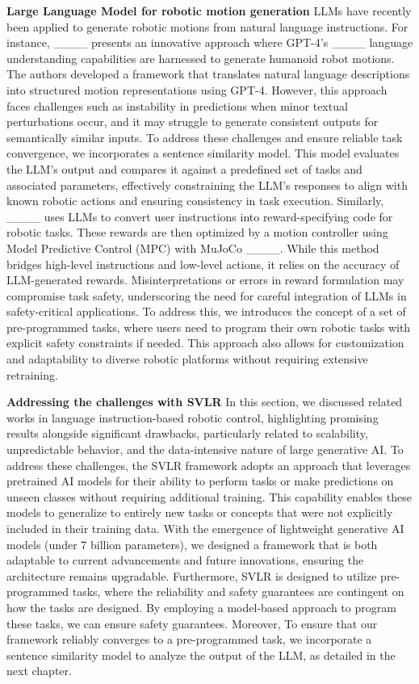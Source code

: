 \textbf{Large Language Model for robotic motion generation} LLMs have recently been applied to generate robotic motions from natural language instructions. For instance, ____ presents an innovative approach where GPT-4's ____ language understanding capabilities are harnessed to generate humanoid robot motions. The authors developed a framework that translates natural language descriptions into structured motion representations using GPT-4. However, this approach faces challenges such as instability in predictions when minor textual perturbations occur, and it may struggle to generate consistent outputs for semantically similar inputs. To address these challenges and ensure reliable task convergence, we incorporates a sentence similarity model. This model evaluates the LLM's output and compares it against a predefined set of tasks and associated parameters, effectively constraining the LLM's responses to align with known robotic actions and ensuring consistency in task execution.
Similarly, ____ uses LLMs to convert user instructions into reward-specifying code for robotic tasks. These rewards are then optimized by a motion controller using Model Predictive Control (MPC) with MuJoCo ____. While this method bridges high-level instructions and low-level actions, it relies on the accuracy of LLM-generated rewards. Misinterpretations or errors in reward formulation may compromise task safety, underscoring the need for careful integration of LLMs in safety-critical applications. To address this, we introduces the concept of a set of pre-programmed tasks, where users need to program their own robotic tasks with explicit safety constraints if needed. This approach also allows for customization and adaptability to diverse robotic platforms without requiring extensive retraining.

\textbf{Addressing the challenges with SVLR} In this section, we discussed related works in language instruction-based robotic control, highlighting promising results alongside significant drawbacks, particularly related to scalability, unpredictable behavior, and the data-intensive nature of large generative AI. To address these challenges, the SVLR framework adopts an approach that leverages pretrained AI models for their ability to perform tasks or make predictions on unseen classes without requiring additional training. This capability enables these models to generalize to entirely new tasks or concepts that were not explicitly included in their training data. With the emergence of lightweight generative AI models (under 7 billion parameters), we designed a framework that is both adaptable to current advancements and future innovations, ensuring the architecture remains upgradable. Furthermore, SVLR is designed to utilize pre-programmed tasks, where the reliability and safety guarantees are contingent on how the tasks are designed. By employing a model-based approach to program these tasks, we can ensure safety guarantees. Moreover, To ensure that our framework reliably converges to a pre-programmed task, we incorporate a sentence similarity model to analyze the output of the LLM, as detailed in the next chapter.